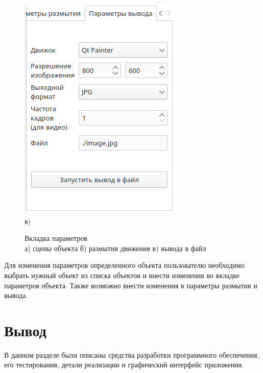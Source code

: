 \begin{figure}[h!]
\begin{minipage}[h]{0.32\linewidth}
{            \includegraphics[width=\linewidth]{img/gui/tab3.png} \\ в)
            }
    \end{minipage}
    \caption{Вкладка параметров \\
    а) сцены объекта 
    б) размытия движения
    в) вывода в файл}
    \label{fig:gui_tabs}
\end{figure}

Для изменения параметров определенного объекта пользователю необходимо выбрать нужный объект из списка объектов и внести изменения во вкладке параметров объекта. Также возможно внести изменения в параметры размытия и вывода. 

\section{Вывод}

В данном разделе были описаны средства разработки программного
обеспечения, его тестирования, детали реализации и графический интерфейс приложения.



